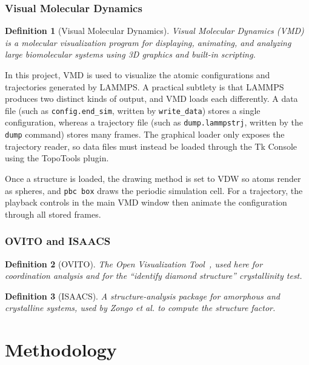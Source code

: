 \documentclass{article}
\newtheorem{definition}{Definition}
\begin{document}
\subsubsection{Visual Molecular Dynamics}

\begin{definition}[Visual Molecular Dynamics]
    Visual Molecular Dynamics (VMD) is a molecular visualization program for displaying, animating, and analyzing large biomolecular systems using 3D graphics and built-in scripting.
\end{definition}

In this project, VMD is used to visualize the atomic configurations and trajectories generated by LAMMPS. A practical subtlety is that LAMMPS produces two distinct kinds of output, and VMD loads each differently. A data file (such as \texttt{config.end\_sim}, written by \texttt{write\_data}) stores a single configuration, whereas a trajectory file (such as \texttt{dump.lammpstrj}, written by the \texttt{dump} command) stores many frames. The graphical loader only exposes the trajectory reader, so data files must instead be loaded through the Tk Console using the TopoTools plugin.

Once a structure is loaded, the drawing method is set to VDW so atoms render as spheres, and \texttt{pbc box} draws the periodic simulation cell. For a trajectory, the playback controls in the main VMD window then animate the configuration through all stored frames.

\subsubsection{OVITO and ISAACS}
\begin{definition}[OVITO]
    The Open Visualization Tool~\cite{ovito}, used here for coordination analysis and for the ``identify diamond structure'' crystallinity test.
\end{definition}
\begin{definition}[ISAACS]
    A structure-analysis package for amorphous and crystalline systems, used by Zongo et al. to compute the structure factor.
\end{definition}


\clearpage
\section{Methodology}
\end{document}
